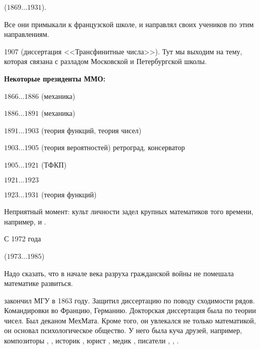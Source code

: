 \documentclass[a4paper,oneside,fleqn,10pt]{article}
\newcommand{\pe}[2]{${#1}\ldots{#2}$}
\begin{document}
(\pe{1869}{1931}).

Все они примыкали к французской школе, и  направлял своих
учеников по этим направлениям.

1907  (диссертация <<Трансфинитные числа>>). Тут мы
выходим на тему, которая связана с разладом Московской и Петербургской
школы.

\textbf{Некоторые президенты ММО:}

\begin{items}{-2}
\item \pe{1866}{1886}  (механика)
\item \pe{1886}{1891}  (механика)
\item \pe{1891}{1903}  (теория функций, теория
  чисел)
\item \pe{1903}{1905}  (теория вероятностей)
  ретроград, консерватор
\item \pe{1905}{1921}  (ТФКП)
\item \pe{1921}{1923} 
\item \pe{1923}{1931}  (теория функций)

Неприятный момент: культ личности задел крупных математиков того
времени, например,  и .

\item С 1972 года  

\item {} (\pe{1973}{1985})
\end{items}

Надо сказать, что в начале века разруха гражданской войны не помешала
математике развиться.

 закончил МГУ в 1863 году. Защитил диссертацию по
поводу сходимости рядов.  Командировки во Францию,
Германию. Докторская диссертация была по теории чисел.  Был деканом
МехМата. Кроме того, он увлекался не только математикой, он основал
психологическое общество.  У него была куча друзей, например,
композиторы , , историк ,
юрист , медик , писатели
, , .
\end{document}
